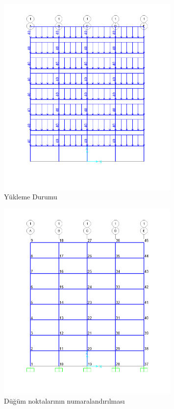\begin{figure}[H]
    \centering
    \includegraphics[width=0.8\textwidth]{weeks_new/imgs/exmp7_fig1.png}
    \caption{Yükleme Durumu}
    \label{fig:loading}
\end{figure}

\begin{figure}[H]
    \centering
    \includegraphics[width=0.8\textwidth]{weeks_new/imgs/exmp7_fig3.png}
    \caption{Düğüm noktalarının numaralandırılması}
    \label{fig:joints}
\end{figure}

